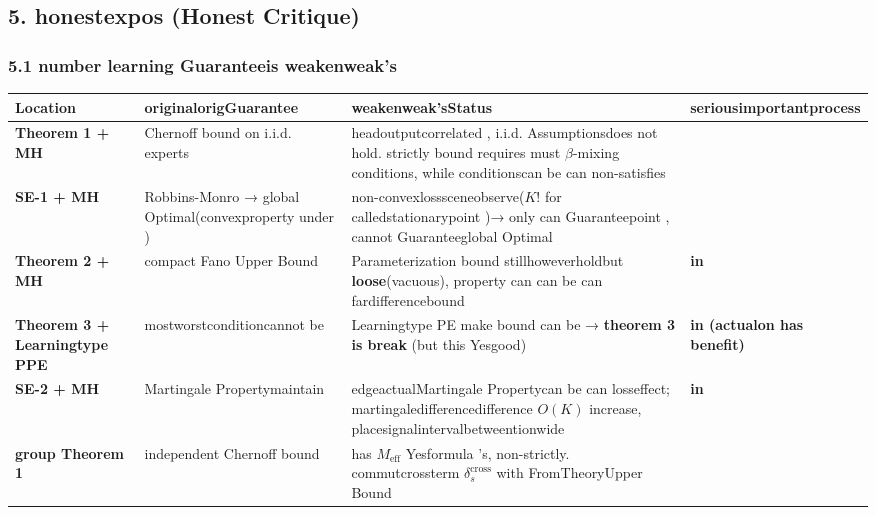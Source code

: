 \documentclass[
  12pt,
]{article}
\begin{document}
\subsection{5. honestexpos (Honest
Critique)}\label{ux8bdaux5b9eux66b4ux51fbhonest-critique}

\subsubsection{5.1
number learning Guaranteeis weakenweak's}\label{ux6570ux5b66ux4fddux8bc1ux88abux524aux5f31ux7684ux5730ux65b9}

\begin{longtable}[]{@{}
  >{\raggedright\arraybackslash}p{}
  >{\raggedright\arraybackslash}p{}
  >{\raggedright\arraybackslash}p{}
  >{\raggedright\arraybackslash}p{}@{}}
\toprule\noalign{}
\begin{minipage}[b]{\linewidth}\raggedright
Location
\end{minipage} & \begin{minipage}[b]{\linewidth}\raggedright
originalorigGuarantee
\end{minipage} & \begin{minipage}[b]{\linewidth}\raggedright
weakenweak'sStatus
\end{minipage} & \begin{minipage}[b]{\linewidth}\raggedright
seriousimportantprocess
\end{minipage} \\
\midrule\noalign{}
\endhead
\bottomrule\noalign{}
\endlastfoot
\textbf{Theorem 1 + MH} & Chernoff bound on i.i.d. experts &
headoutputcorrelated , i.i.d. Assumptionsdoes not hold. strictly bound requires must  \(\beta\)-mixing
conditions, while conditionscan be can non-satisfies  & \textbf{} \\
\textbf{SE-1 + MH} & Robbins-Monro → global Optimal(convexproperty under ) &
non-convexlosssceneobserve(\(K!\) for calledstationarypoint )→ only can Guaranteepoint , cannot Guaranteeglobal Optimal &
\textbf{} \\
\textbf{Theorem 2 + MH} & compact Fano Upper Bound &
Parameterization bound stillhoweverholdbut \textbf{loose}(vacuous), property can can be can fardifferencebound 
& \textbf{in } \\
\textbf{Theorem 3 + Learningtype  PPE} & mostworstconditioncannot be  & Learningtype  PE
make bound can be  → \textbf{theorem  3 is break }(but this Yesgood) &
\textbf{in (actualon has benefit)} \\
\textbf{SE-2 + MH} & Martingale Propertymaintain  & edgeactualMartingale Propertycan be can losseffect; martingaledifferencedifference
\(O(K)\) increase, placesignalintervalbetweentionwide & \textbf{in } \\
\textbf{group Theorem 1} & independent  Chernoff bound & has  \(M_{\text{eff}}\)
Yesformula 's, non-strictly. commutcrossterm \(\delta_s^{\text{cross}}\) with FromTheoryUpper Bound
& \textbf{} \\
\end{longtable}
\end{document}
